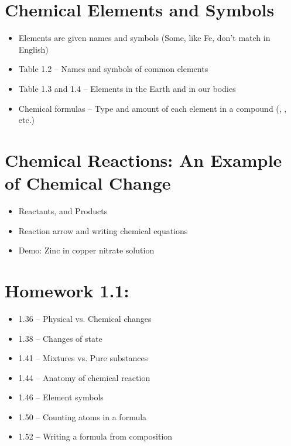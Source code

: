 \documentclass[12pt, openany, letterpaper]{memoir}
\begin{document}
\section{Chemical Elements and Symbols}
\begin{itemize}
	\item Elements are given names and symbols (Some, like Fe, don't match in English)
	\item Table 1.2 -- Names and symbols of common elements
  \item Table 1.3 and 1.4 -- Elements in the Earth and in our bodies
  \item Chemical formulas -- Type and amount of each element in a compound (, , etc.)
\end{itemize}

\section{Chemical Reactions: An Example of Chemical Change}
\begin{itemize}
  \item Reactants, and Products
  \item Reaction arrow and writing chemical equations
	\item Demo: Zinc in copper nitrate solution
\end{itemize}

\section*{Homework 1.1:}
	\begin{itemize}
		\item 1.36 -- Physical vs. Chemical changes
		\item 1.38 -- Changes of state
		\item 1.41 -- Mixtures vs. Pure substances
    \item 1.44 -- Anatomy of chemical reaction
		\item 1.46 -- Element symbols
		\item 1.50 -- Counting atoms in a formula
    \item 1.52 -- Writing a formula from composition
	\end{itemize}
\end{document}
